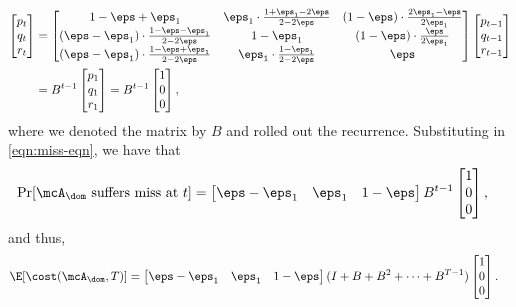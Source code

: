 \begin{align*}
    \begin{bmatrix}
        p_t \\ q_t \\ r_t
    \end{bmatrix}
    &=
    \begin{bmatrix}
       1-\eps+\eps_1  & \eps_1 \cdot \frac{1+\eps_1-2\eps}{2-2\eps} & (1-\eps) \cdot \frac{2\eps_1-\eps}{2\eps_1} \\
       (\eps-\eps_1) \cdot \frac{1-\eps-\eps_1}{2-2\eps} & 1-\eps_1 & (1-\eps) \cdot \frac{\eps}{2\eps_1} \\
       (\eps-\eps_1) \cdot \frac{1-\eps+\eps_1}{2-2\eps} & \eps_1 \cdot \frac{1-\eps_1}{2-2\eps} & \eps
    \end{bmatrix}
    \begin{bmatrix}
        p_{t-1} \\ q_{t-1} \\ r_{t-1}
    \end{bmatrix} \\
    &= B^{t-1} \begin{bmatrix}
        p_{1} \\ q_{1} \\ r_{1}
    \end{bmatrix}
    = B^{t-1} \begin{bmatrix}
        1 \\ 0 \\ 0
    \end{bmatrix},
\end{align*}
where we denoted the matrix by $B$ and rolled out the recurrence. Substituting in \eqref{eqn:miss-eqn}, we have that
\begin{align*}
    \Pr[\mcA_\dom \text{ suffers miss at }t] &= 
    \begin{bmatrix}
        \eps-\eps_1 & \eps_1 & 1-\eps
    \end{bmatrix}
    B^{t-1} \begin{bmatrix}
        1 \\ 0 \\ 0
    \end{bmatrix},
\end{align*}
and thus,
\begin{align}
    \E[\cost(\mcA_\dom, T)] &= \begin{bmatrix}
        \eps-\eps_1 & \eps_1 & 1-\eps
    \end{bmatrix}
    (I + B + B^2 + \dots + B^{T-1}) \begin{bmatrix}
        1 \\ 0 \\ 0
    \end{bmatrix}. \label{eqn:dom-gen-misses}
\end{align}
